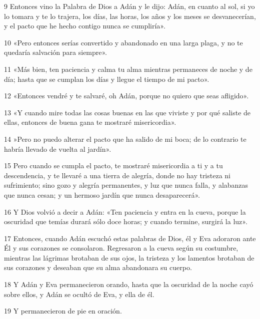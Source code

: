 \par 9 Entonces vino la Palabra de Dios a Adán y le dijo: Adán, en cuanto al sol, si yo lo tomara y te lo trajera, los días, las horas, los años y los meses se desvanecerían, y el pacto que he hecho contigo nunca se cumpliría».

\par 10 «Pero entonces serías convertido y abandonado en una larga plaga, y no te quedaría salvación para siempre».

\par 11 «Más bien, ten paciencia y calma tu alma mientras permaneces de noche y de día; hasta que se cumplan los días y llegue el tiempo de mi pacto».

\par 12 «Entonces vendré y te salvaré, oh Adán, porque no quiero que seas afligido».

\par 13 «Y cuando mire todas las cosas buenas en las que viviste y por qué saliste de ellas, entonces de buena gana te mostraré misericordia».

\par 14 »Pero no puedo alterar el pacto que ha salido de mi boca; de lo contrario te habría llevado de vuelta al jardín».

\par 15 Pero cuando se cumpla el pacto, te mostraré misericordia a ti y a tu descendencia, y te llevaré a una tierra de alegría, donde no hay tristeza ni sufrimiento; sino gozo y alegría permanentes, y luz que nunca falla, y alabanzas que nunca cesan; y un hermoso jardín que nunca desaparecerá».

\par 16 Y Dios volvió a decir a Adán: «Ten paciencia y entra en la cueva, porque la oscuridad que temías durará sólo doce horas; y cuando termine, surgirá la luz».

\par 17 Entonces, cuando Adán escuchó estas palabras de Dios, él y Eva adoraron ante Él y sus corazones se consolaron. Regresaron a la cueva según su costumbre, mientras las lágrimas brotaban de sus ojos, la tristeza y los lamentos brotaban de sus corazones y deseaban que su alma abandonara su cuerpo.

\par 18 Y Adán y Eva permanecieron orando, hasta que la oscuridad de la noche cayó sobre ellos, y Adán se ocultó de Eva, y ella de él.

\par 19 Y permanecieron de pie en oración.

